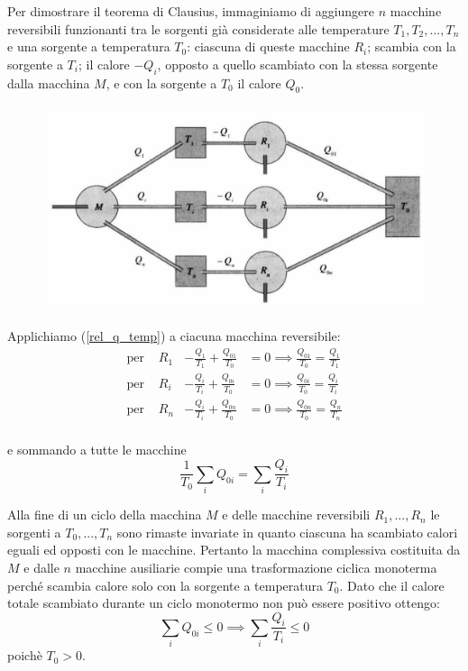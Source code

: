 \documentclass[class=book, crop=false, oneside, 12pt]{standalone}
\begin{document}
Per dimostrare il teorema di Clausius, immaginiamo di aggiungere \(n\) macchine reversibili funzionanti tra le sorgenti già considerate alle temperature \(T_1 , T_2 , ... , T_n\) e una sorgente a temperatura \(T_0\): ciascuna di queste macchine \(R_i\); scambia con la sorgente a \(T_i\); il calore \(-Q_i\), opposto a quello scambiato con la stessa sorgente dalla macchina \(M\), e con la sorgente a \(T_0\) il calore \(Q_0\).
\begin{figure}[h]
    \includegraphics[scale=0.4]{clausius_dim.png}
    \centering
    \caption{}
\end{figure}
Applichiamo (\ref{rel_q_temp}) a ciacuna macchina reversibile:\\
\begin{align*}
    \text{per } &R_1 & -\frac{Q_1}{T_1} + \frac{Q_{01}}{T_0} &= 0 \implies \frac{Q_{01}}{T_0} = \frac{Q_1}{T_1} \\
    \text{per } &R_i & -\frac{Q_i}{T_i} + \frac{Q_{0i}}{T_0} &= 0 \implies \frac{Q_{0i}}{T_0} = \frac{Q_i}{T_i} \\
    \text{per } &R_n & -\frac{Q_i}{T_i} + \frac{Q_{0n}}{T_0} &= 0 \implies \frac{Q_{0n}}{T_0} = \frac{Q_n}{T_n} \\
\end{align*}

e sommando a tutte le macchine 
\begin{equation*}
    \frac{1}{T_0} \sum_i Q_{0i} = \sum_{i} \frac{Q_i}{T_i}
\end{equation*}

Alla fine di un ciclo della macchina \(M\) e delle macchine reversibili \(R_1, ... , R_n\) le sorgenti a \(T_0, ... , T_n\) sono rimaste invariate in quanto ciascuna ha scambiato calori eguali ed opposti con le macchine. 
Pertanto la macchina complessiva costituita da \(M\) e dalle \(n\) macchine ausiliarie compie una trasformazione ciclica monoterma perché scambia calore solo con la sorgente a temperatura \(T_0\).
Dato che il calore totale scambiato durante un ciclo monotermo non può essere positivo ottengo:
\begin{equation*}
    \sum_i Q_{0i} \leq 0 \implies \sum_i \frac{Q_i}{T_i} \leq 0
\end{equation*}
poichè \(T_0 > 0 \).
\end{document}
